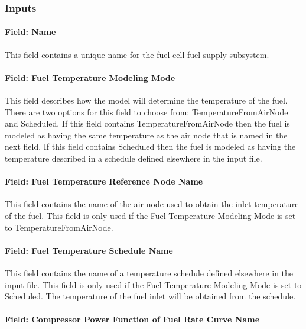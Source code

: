 \subsubsection{Inputs}\label{inputs-19-000}

\paragraph{Field: Name}\label{field-name-22}

This field contains a unique name for the fuel cell fuel supply subsystem.

\paragraph{Field: Fuel Temperature Modeling Mode}\label{field-fuel-temperature-modeling-mode}

This field describes how the model will determine the temperature of the fuel. There are two options for this field to choose from: TemperatureFromAirNode and Scheduled. If this field contains TemperatureFromAirNode then the fuel is modeled as having the same temperature as the air node that is named in the next field. If this field contains Scheduled then the fuel is modeled as having the temperature described in a schedule defined elsewhere in the input file.

\paragraph{Field: Fuel Temperature Reference Node Name}\label{field-fuel-temperature-reference-node-name}

This field contains the name of the air node used to obtain the inlet temperature of the fuel. This field is only used if the Fuel Temperature Modeling Mode is set to TemperatureFromAirNode.

\paragraph{Field: Fuel Temperature Schedule Name}\label{field-fuel-temperature-schedule-name}

This field contains the name of a temperature schedule defined elsewhere in the input file. This field is only used if the Fuel Temperature Modeling Mode is set to Scheduled. The temperature of the fuel inlet will be obtained from the schedule.

\paragraph{Field: Compressor Power Function of Fuel Rate Curve Name}\label{field-compressor-power-function-of-fuel-rate-curve-name}

